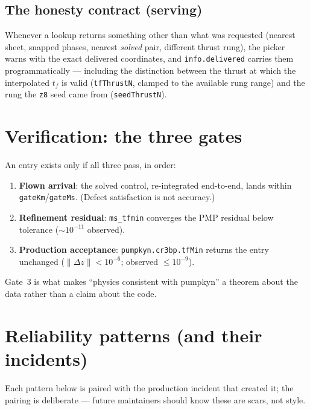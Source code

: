 \documentclass[11pt]{article}
\begin{document}
\subsection{The honesty contract (serving)}

Whenever a lookup returns something other than what was requested (nearest
sheet, snapped phases, nearest \emph{solved} pair, different thrust rung),
the picker warns with the exact delivered coordinates, and
\texttt{info.delivered} carries them programmatically ---
including the distinction between the thrust at which the interpolated
$t_f$ is valid (\texttt{tfThrustN}, clamped to the available rung range)
and the rung the \texttt{z8} seed came from (\texttt{seedThrustN}).

\section{Verification: the three gates}
\label{sec:gates}

An entry exists only if all three pass, in order:
\begin{enumerate}
\item \textbf{Flown arrival}: the solved control, re-integrated end-to-end,
      lands within \texttt{gateKm}/\texttt{gateMs}. (Defect satisfaction is
      not accuracy.)
\item \textbf{Refinement residual}: \texttt{ms\_tfmin} converges the PMP
      residual below tolerance ($\sim10^{-11}$ observed).
\item \textbf{Production acceptance}: \texttt{pumpkyn.cr3bp.tfMin} returns
      the entry unchanged ($\lVert\Delta z\rVert<10^{-6}$; observed
      $\leq10^{-9}$).
\end{enumerate}
Gate~3 is what makes ``physics consistent with pumpkyn'' a theorem about
the data rather than a claim about the code.

\section{Reliability patterns (and their incidents)}

Each pattern below is paired with the production incident that created it;
the pairing is deliberate --- future maintainers should know these are
scars, not style.
\end{document}
